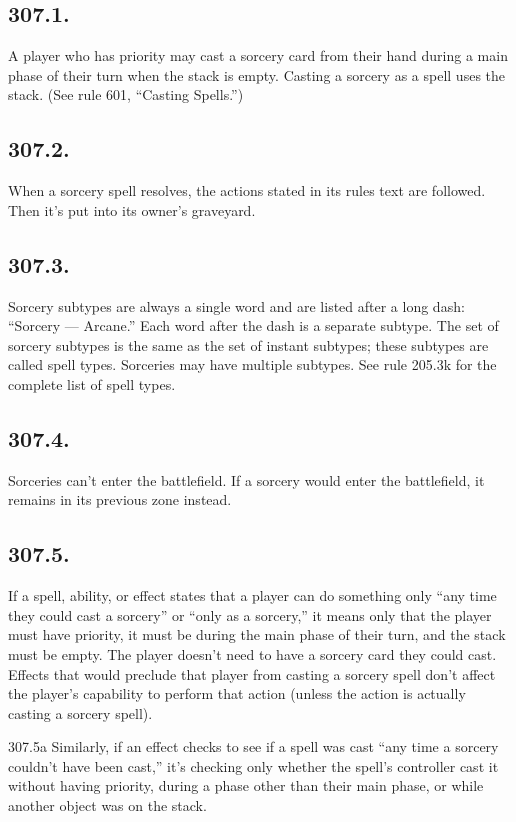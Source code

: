 \subsection*{307.1.}
A player who has priority may cast a sorcery card from their hand during a main phase of their turn when the stack is empty. Casting a sorcery as a spell uses the stack. (See rule 601, “Casting Spells.”)

\subsection*{307.2.}
When a sorcery spell resolves, the actions stated in its rules text are followed. Then it’s put into its owner’s graveyard.

\subsection*{307.3.}
Sorcery subtypes are always a single word and are listed after a long dash: “Sorcery — Arcane.” Each word after the dash is a separate subtype. The set of sorcery subtypes is the same as the set of instant subtypes; these subtypes are called spell types. Sorceries may have multiple subtypes. See rule 205.3k for the complete list of spell types.

\subsection*{307.4.}
Sorceries can’t enter the battlefield. If a sorcery would enter the battlefield, it remains in its previous zone instead.

\subsection*{307.5.}
If a spell, ability, or effect states that a player can do something only “any time they could cast a sorcery” or “only as a sorcery,” it means only that the player must have priority, it must be during the main phase of their turn, and the stack must be empty. The player doesn’t need to have a sorcery card they could cast. Effects that would preclude that player from casting a sorcery spell don’t affect the player’s capability to perform that action (unless the action is actually casting a sorcery spell).

307.5a Similarly, if an effect checks to see if a spell was cast “any time a sorcery couldn’t have been cast,” it’s checking only whether the spell’s controller cast it without having priority, during a phase other than their main phase, or while another object was on the stack.

